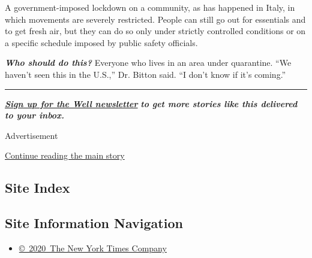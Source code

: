 A government-imposed lockdown on a community, as has happened in Italy,
in which movements are severely restricted. People can still go out for
essentials and to get fresh air, but they can do so only under strictly
controlled conditions or on a specific schedule imposed by public safety
officials.

\emph{\textbf{Who should do this?}} Everyone who lives in an area under
quarantine. ``We haven't seen this in the U.S.,'' Dr. Bitton said. ``I
don't know if it's coming.''

\begin{center}\rule{0.5\linewidth}{\linethickness}\end{center}

\textbf{\href{https://www.nytimes3xbfgragh.onion/newsletters/well}{\emph{Sign
up for the Well newsletter}}} \emph{\textbf{to get more stories like
this delivered to your inbox.}}

Advertisement

\protect\hyperlink{after-bottom}{Continue reading the main story}

\hypertarget{site-index}{%
\subsection{Site Index}\label{site-index}}

\hypertarget{site-information-navigation}{%
\subsection{Site Information
Navigation}\label{site-information-navigation}}

\begin{itemize}
\tightlist
\item
  \href{https://help.nytimes3xbfgragh.onion/hc/en-us/articles/115014792127-Copyright-notice}{©~2020~The
  New York Times Company}
\end{itemize}

